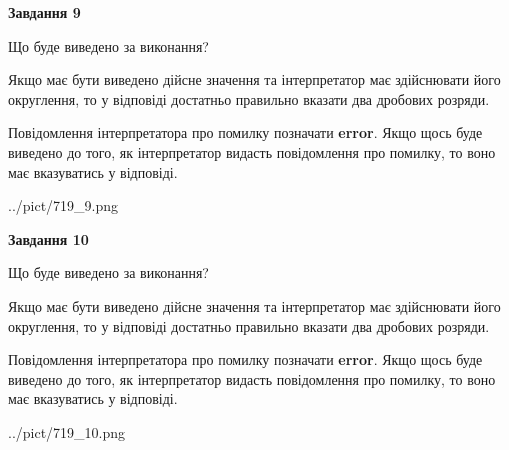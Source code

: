 \documentclass[12pt, ukrainian]{article}
\begin{document}
{\begin {Large}
{\begin {center}\textbf{Завдання 9}\end {center}}\par
Що буде виведено за виконання? \par

Якщо має бути виведено дійсне значення та інтерпретатор має здійснювати його округлення, 
то у відповіді достатньо правильно вказати два дробових розряди.

Повідомлення інтерпретатора про помилку позначати \textbf{error}.
Якщо щось буде виведено до того, як інтерпретатор видасть повідомлення про помилку, 
то воно має вказуватись у відповіді. \par

\begin{center}
	{../pict/719_9.png}
\end{center}
\newpage

{\begin {center}\textbf{Завдання 10}\end {center}}\par
Що буде виведено за виконання? \par

Якщо має бути виведено дійсне значення та інтерпретатор має здійснювати його округлення, 
то у відповіді достатньо правильно вказати два дробових розряди.

Повідомлення інтерпретатора про помилку позначати \textbf{error}.
Якщо щось буде виведено до того, як інтерпретатор видасть повідомлення про помилку, 
то воно має вказуватись у відповіді. \par

\begin{center}
	{../pict/719_10.png}
\end{center}
\newpage

\end {Large}}
\end{document}
